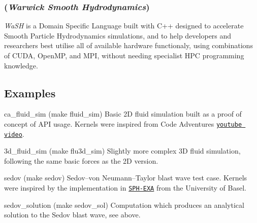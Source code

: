 \subsubsection*{({\itshape {\bfseries Wa}rwick {\bfseries S}mooth {\bfseries H}ydrodynamics})}

{\itshape Wa\+SH} is a Domain Specific Language built with C++ designed to accelerate Smooth Particle Hydrodynamics simulations, and to help developers and researchers best utilise all of available hardware functionaly, using combinations of C\+U\+DA, Open\+MP, and M\+PI, without needing specialist H\+PC programming knowledge.

\subsection*{Examples}


\begin{DoxyItemize}
\item {\ttfamily ca\+\_\+fluid\+\_\+sim} ({\ttfamily make fluid\+\_\+sim}) Basic 2D fluid simulation built as a proof of concept of A\+PI usage. Kernels were inspired from Code Adventures \href{https://www.youtube.com/watch?v=rSKMYc1CQHE}{\tt youtube video}.
\item {\ttfamily 3d\+\_\+fluid\+\_\+sim} ({\ttfamily make flu3d\+\_\+sim}) Slightly more complex 3D fluid simulation, following the same basic forces as the 2D version.
\item {\ttfamily sedov} ({\ttfamily make sedov}) Sedov–von Neumann–\+Taylor blast wave test case. Kernels were inspired by the implementation in \href{https://github.com/unibas-dmi-hpc/SPH-EXA}{\tt S\+P\+H-\/\+E\+XA} from the University of Basel.
\item {\ttfamily sedov\+\_\+solution} ({\ttfamily make sedov\+\_\+sol}) Computation which produces an analytical solution to the Sedov blast wave, see above. 
\end{DoxyItemize}